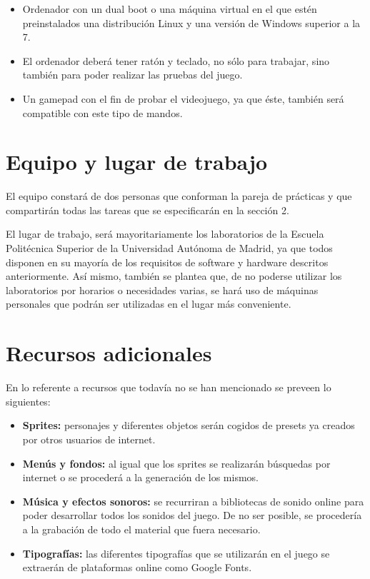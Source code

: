 \documentclass[palatino]{apuntes}
\begin{document}
\begin{itemize}
	\item Ordenador con un dual boot o una máquina virtual en el que estén preinstalados una distribución Linux y una versión de Windows superior a la 7.
	\item El ordenador deberá tener ratón y teclado, no sólo para trabajar, sino también para poder realizar las pruebas del juego.
	\item Un gamepad con el fin de probar el videojuego, ya que éste, también será compatible con este tipo de mandos.
\end{itemize}


\section{Equipo y lugar de trabajo}
El equipo constará de dos personas que conforman la pareja de prácticas y que compartirán todas las tareas que se especificarán en la sección 2.

El lugar de trabajo, será mayoritariamente los laboratorios de la Escuela Politécnica Superior de la Universidad Autónoma de Madrid, ya que todos disponen en su mayoría de los requisitos de software y hardware descritos anteriormente. Así mismo, también se plantea que, de no poderse utilizar los laboratorios por horarios o necesidades varias, se hará uso de máquinas personales que podrán ser utilizadas en el lugar más conveniente.


\section{Recursos adicionales}
En lo referente a recursos que todavía no se han mencionado se preveen lo siguientes:

\begin{itemize}
	\item \textbf{Sprites:} personajes y diferentes objetos serán cogidos de presets ya creados por otros usuarios de internet.
	\item \textbf{Menús y fondos:} al igual que los sprites se realizarán búsquedas por internet o se procederá a la generación de los mismos.
	\item \textbf{Música y efectos sonoros:} se recurriran a bibliotecas de sonido online para poder desarrollar todos los sonidos del juego. De no ser posible, se procedería a la grabación de todo el material que fuera necesario.
	\item \textbf{Tipografías:} las diferentes tipografías que se utilizarán en el juego se extraerán de plataformas online como Google Fonts.
\end{itemize}
\end{document}
